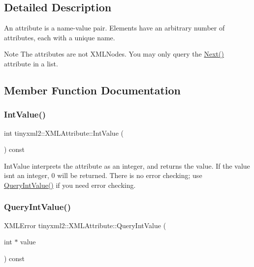 \subsection{Detailed Description}
An attribute is a name-\/value pair. Elements have an arbitrary number of attributes, each with a unique name.

\begin{DoxyNote}{Note}
The attributes are not X\+M\+L\+Nodes. You may only query the \mbox{\hyperlink{classtinyxml2_1_1_x_m_l_attribute_aee53571b21e7ce5421eb929523a8bbe6}{Next()}} attribute in a list. 
\end{DoxyNote}


\subsection{Member Function Documentation}
\mbox{\label{classtinyxml2_1_1_x_m_l_attribute_adfa2433f0fdafd5c3880936de9affa80}} 
\subsubsection{\texorpdfstring{IntValue()}{IntValue()}}
{\footnotesize\ttfamily int tinyxml2\+::\+X\+M\+L\+Attribute\+::\+Int\+Value (\begin{DoxyParamCaption}{ }\end{DoxyParamCaption}) const\hspace{0.3cm}{\ttfamily [inline]}}

Int\+Value interprets the attribute as an integer, and returns the value. If the value isn\textquotesingle{}t an integer, 0 will be returned. There is no error checking; use \mbox{\hyperlink{classtinyxml2_1_1_x_m_l_attribute_a6d5176260db00ea301c01af8457cd993}{Query\+Int\+Value()}} if you need error checking. \mbox{\label{classtinyxml2_1_1_x_m_l_attribute_a6d5176260db00ea301c01af8457cd993}} 
\subsubsection{\texorpdfstring{QueryIntValue()}{QueryIntValue()}}
{\footnotesize\ttfamily X\+M\+L\+Error tinyxml2\+::\+X\+M\+L\+Attribute\+::\+Query\+Int\+Value (\begin{DoxyParamCaption}\item[{int $\ast$}]{value }\end{DoxyParamCaption}) const}

